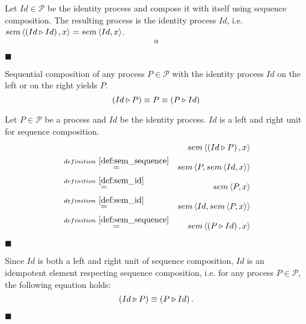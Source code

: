 \begin{myproof}
Let $Id \in \mathcal{P}$ be the identity process and compose it with itself using sequence composition. The resulting process is the identity process $Id$, i.e. $sem \left\langle \left( Id \triangleright Id \right), x \right\rangle = sem \left\langle Id, x \right\rangle$.
\begin{eqnarray*}
  a
\end{eqnarray*}

\hfill$\blacksquare$
\end{myproof}


\begin{theorem}
\label{thm:idempotence_identity}
Sequential composition of any process $P \in \mathcal{P}$ with the identity process $Id$ on the left or on the right yields $P$.
\begin{equation*}
  \left( Id \triangleright P \right) \equiv P \equiv \left( P \triangleright Id \right)
\end{equation*}
\end{theorem}

\begin{myproof}
Let $P \in \mathcal{P}$ be a process and $Id$ be the identity process. $Id$ is a left and right unit for sequence composition.
\begin{eqnarray*}
  & & \sem{\sequence{Id}{P}}{x} \\
    & \overset{\defref{def:sem_sequence}}{=} & \sem{P}{\sem{Id}{x}} \\
    & \overset{\defref{def:sem_id}}{=} & \sem{P}{x} \\
    & \overset{\defref{def:sem_id}}{=} & \sem{Id}{\sem{P}{x}} \\
    & \overset{\defref{def:sem_sequence}}{=} & \sem{\sequence{P}{Id}}{x} \\
\end{eqnarray*}

\hfill$\blacksquare$
\end{myproof}

\begin{corollary}
Since $Id$ is both a left and right unit of sequence composition, $Id$ is an idempotent element respecting sequence composition, i.e. for any process $P \in \mathcal{P}$, the following equation holds:
\begin{equation*}
  \left( Id \triangleright P \right) \equiv \left( P \triangleright Id \right).
\end{equation*}

\hfill$\blacksquare$
\end{corollary}
